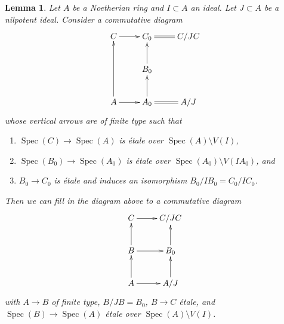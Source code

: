\documentclass[10pt,a4paper]{amsart}
\theoremstyle{plain}
\newtheorem{lemma}[subsection]{Lemma}
\theoremstyle{definition}
\theoremstyle{remark}
\numberwithin{equation}{subsection}
\def\Spec{\mathop{\mathrm{Spec}}}
\begin{document}
\begin{lemma}
\label{lemma-lift-approximation}
Let $A$ be a Noetherian ring and $I \subset A$ an ideal.
Let $J \subset A$ be a nilpotent ideal. Consider a commutative diagram
$$
\xymatrix{
C \ar[r] & C_0 \ar@{=}[r] & C/JC \\
& B_0 \ar[u] \\
A \ar[r] \ar[uu] & A_0 \ar[u] \ar@{=}[r] & A/J
}
$$
whose vertical arrows are of finite type such that
\begin{enumerate}
\item $\Spec(C) \to \Spec(A)$ is \'etale over $\Spec(A) \setminus V(I)$,
\item $\Spec(B_0) \to \Spec(A_0)$ is \'etale over
$\Spec(A_0) \setminus V(IA_0)$, and
\item $B_0 \to C_0$ is \'etale and induces an isomorphism
$B_0/IB_0 = C_0/IC_0$.
\end{enumerate}
Then we can fill in the diagram above to a commutative diagram
$$
\xymatrix{
C \ar[r] & C/JC \\
B \ar[u] \ar[r] & B_0 \ar[u] \\
A \ar[r] \ar[u] & A/J \ar[u]
}
$$
with $A \to B$ of finite type, $B/JB = B_0$, $B \to C$ \'etale, and
$\Spec(B) \to \Spec(A)$ \'etale over $\Spec(A) \setminus V(I)$.
\end{lemma}
\end{document}
